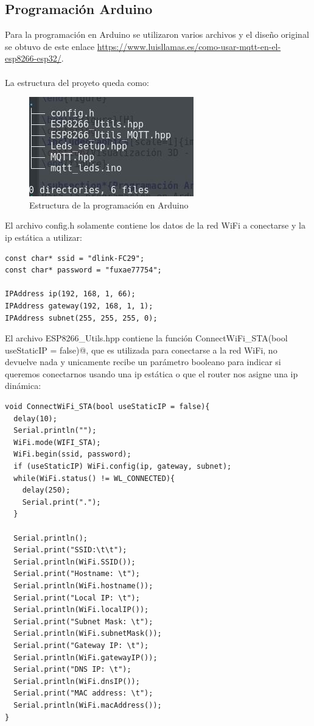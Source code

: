 \documentclass[oneside]{article}
\begin{document}
\subsection*{Programación Arduino}
Para la programación en Arduino se utilizaron varios archivos y el diseño original se obtuvo de este enlace  
\url{https://www.luisllamas.es/como-usar-mqtt-en-el-esp8266-esp32/}.
\\\\
La estructura del proyeto queda como:
\begin{figure}[H]
\centering
\includegraphics[scale=1]{images/estructura_arduino.jpg}
\caption{Estructura de la programación en Arduino}
\end{figure}
El archivo {\color{blue}config.h} solamente contiene los datos de la red WiFi a conectarse y la ip estática a utilizar:
\begin{lstlisting}[frame=single]
const char* ssid = "dlink-FC29";
const char* password = "fuxae77754";

IPAddress ip(192, 168, 1, 66);
IPAddress gateway(192, 168, 1, 1);
IPAddress subnet(255, 255, 255, 0);
\end{lstlisting}

El archivo {\color{blue}ESP8266\_Utils.hpp} contiene la función \verb@void ConnectWiFi_STA(bool useStaticIP = false)@, que es utilizada para conectarse a la red WiFi, no devuelve nada y unicamente recibe un parámetro booleano para indicar si queremos conectarnos usando una ip estática o que el router nos asigne una ip dinámica:
\begin{lstlisting}[frame=single]
void ConnectWiFi_STA(bool useStaticIP = false){
  delay(10);
  Serial.println("");
  WiFi.mode(WIFI_STA);
  WiFi.begin(ssid, password);
  if (useStaticIP) WiFi.config(ip, gateway, subnet);
  while(WiFi.status() != WL_CONNECTED){
    delay(250);
    Serial.print(".");
  }
  
  Serial.println();
  Serial.print("SSID:\t\t");
  Serial.println(WiFi.SSID());
  Serial.print("Hostname: \t");
  Serial.println(WiFi.hostname());
  Serial.print("Local IP: \t");
  Serial.println(WiFi.localIP());
  Serial.print("Subnet Mask: \t");
  Serial.println(WiFi.subnetMask());
  Serial.print("Gateway IP: \t");
  Serial.println(WiFi.gatewayIP());
  Serial.print("DNS IP: \t");
  Serial.println(WiFi.dnsIP());
  Serial.print("MAC address: \t");
  Serial.println(WiFi.macAddress());
}
\end{lstlisting}
\end{document}

